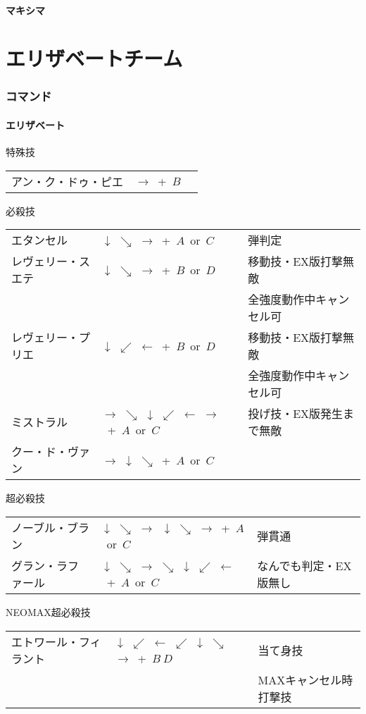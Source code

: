 \documentclass[a4j,11pt]{jarticle}
\def\hado{$\downarrow$ $\searrow$ $\rightarrow$}%
\def\tatsu{$\downarrow$ $\swarrow$ $\leftarrow$}%
\def\syoryu{$\rightarrow$ $\downarrow$ $\searrow$}%
\def\tenti{$\rightarrow$ $\searrow$ $\downarrow$ $\swarrow$ $\leftarrow$ $\rightarrow$}%
\def\ryuko{$\downarrow$ $\searrow$ $\rightarrow$ $\searrow$ $\downarrow$ $\swarrow$ $\leftarrow$}%
\def\orochi{$\downarrow$ $\swarrow$ $\leftarrow$ $\swarrow$ $\downarrow$ $\searrow$ $\rightarrow$}%
\begin{document}
\subsection{マキシマ}
\newpage
\part{エリザベートチーム}%
\section{コマンド}
\subsection{エリザベート}
\begin{itembox}[l]{特殊技}
\begin{tabular}{lll}
アン・ク・ドゥ・ピエ&$\rightarrow$\ +\ $B$&%
\end{tabular}
\end{itembox}
\begin{itembox}[l]{必殺技}
\begin{tabular}{lll}
エタンセル&\hado\ +\ $A$\ or\ $C$&弾判定\\%
レヴェリー・スエテ&\hado\ +\ $B$\ or\ $D$&移動技・EX版打撃無敵\\%
&&全強度動作中キャンセル可\\
レヴェリー・プリエ&\tatsu\ +\ $B$\ or\ $D$&移動技・EX版打撃無敵\\%
&&全強度動作中キャンセル可\\
ミストラル&\tenti\ +\ $A$\ or\ $C$&投げ技・EX版発生まで無敵\\%
クー・ド・ヴァン&\syoryu\ +\ $A$\ or\ $C$&%
\end{tabular}
\end{itembox}
\begin{itembox}[l]{超必殺技}
\begin{tabular}{lll}
ノーブル・ブラン&\hado\ \hado\ +\ $A$\ or\ $C$&弾貫通\\%
グラン・ラファール&\ryuko\ +\ $A$\ or\ $C$&なんでも判定・EX版無し%
\end{tabular}
\end{itembox}
\begin{itembox}[l]{NEOMAX超必殺技}
\begin{tabular}{lll}
エトワール・フィラント&\orochi\ +\ $B\ D$&当て身技\\%
&&MAXキャンセル時打撃技
\end{tabular}
\end{itembox}
\newpage
\end{document}

